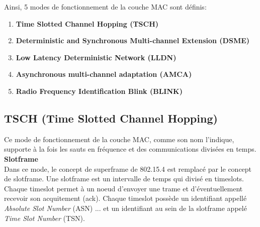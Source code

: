 Ainsi, 5 modes de fonctionnement de la couche MAC sont définis:
\begin{enumerate}
  \item \textbf{Time Slotted Channel Hopping (TSCH)}\\
  \item \textbf{Deterministic and Synchronous Multi-channel Extension (DSME)}\\
  \item \textbf{Low Latency Deterministic Network (LLDN)}\\
  \item \textbf{Asynchronous multi-channel adaptation (AMCA)}\\
  \item \textbf{Radio Frequency Identification Blink (BLINK)}\\
\end{enumerate}

\subsection{TSCH (Time Slotted Channel Hopping)}\label{subsec:etat_art-802.15.4.tsch}

Ce mode de fonctionnement de la couche MAC, comme son nom l'indique, supporte à la fois les sauts en fréquence et des communications divisées en temps.\\

\textbf{Slotframe}\\
Dans ce mode, le concept de superframe de 802.15.4 est remplacé par le concept de slotframe.
Une slotframe est un intervalle de temps qui divisé en timeslots. Chaque timeslot permet à un noeud d'envoyer une trame et d'éventuellement recevoir son acquitement (ack).
Chaque timeslot possède un identifiant appellé \textit{Absolute Slot Number} (ASN) ...
et un identifiant au sein de la slotframe appelé \textit{Time Slot Number} (TSN).

